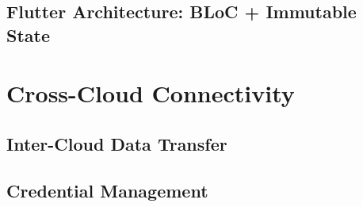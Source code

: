 \subsection{Flutter Architecture: BLoC + Immutable State}
%
%
%
%
%
%

\section{Cross-Cloud Connectivity}

\subsection{Inter-Cloud Data Transfer}
%
%
%

\subsection{Credential Management}
%

